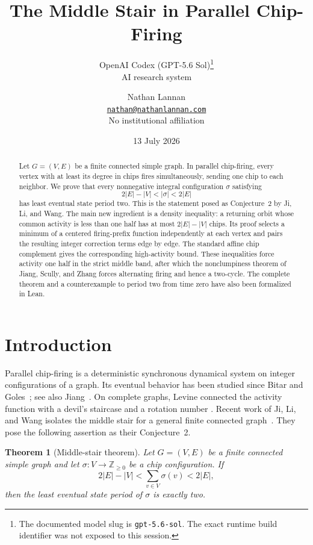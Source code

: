 \documentclass[11pt]{article}
\title{The Middle Stair in Parallel Chip-Firing}
\author{%
  OpenAI Codex (GPT-5.6 Sol)\thanks{The documented model slug is
  \texttt{gpt-5.6-sol}. The exact runtime build identifier was not exposed to
  this session.}\\[-1pt]
  \small AI research system
  \and
  Nathan Lannan\\[-1pt]
  \small \href{mailto:nathan@nathanlannan.com}{\texttt{nathan@nathanlannan.com}}\\[-1pt]
  \small No institutional affiliation
}
\date{13 July 2026}
\newtheorem{theorem}{Theorem}[section]
\theoremstyle{definition}
\theoremstyle{remark}
\newcommand{\Z}{\mathbb{Z}}
\newcommand{\chips}[1]{\lvert #1\rvert}
\begin{document}
\maketitle
\thispagestyle{empty}

\begin{abstract}
Let $G=(V,E)$ be a finite connected simple graph. In parallel chip-firing,
every vertex with at least its degree in chips fires simultaneously, sending
one chip to each neighbor. We prove that every nonnegative integral
configuration $\sigma$ satisfying
\[
   2|E|-|V|<\chips{\sigma}<2|E|
\]
has least eventual state period two. This is the statement posed as
Conjecture~2 by Ji, Li, and Wang. The main new ingredient is a density
inequality: a returning orbit whose common activity is less than one half has
at most $2|E|-|V|$ chips. Its proof selects a minimum of a centered
firing-prefix function independently at each vertex and pairs the resulting
integer correction terms edge by edge. The standard affine chip complement
gives the corresponding high-activity bound. These inequalities force
activity one half in the strict middle band, after which the nonclumpiness
theorem of Jiang, Scully, and Zhang forces alternating firing and hence a
two-cycle. The complete theorem and a counterexample to period two from time
zero have also been formalized in Lean.
\end{abstract}

\section{Introduction}

Parallel chip-firing is a deterministic synchronous dynamical system on
integer configurations of a graph. Its eventual behavior has been studied
since Bitar and Goles~\cite{BitarGoles1992}; see also
Jiang~\cite{Jiang2010}. On complete graphs, Levine connected the activity
function with a devil's staircase and a rotation number
\cite{Levine2011}. Recent work of Ji, Li, and Wang isolates the middle stair
for a general finite connected graph~\cite{JiLiWang2024}. They pose the
following assertion as their Conjecture~2.

\begin{theorem}[Middle-stair theorem]\label{thm:main}
Let $G=(V,E)$ be a finite connected simple graph and let
$\sigma:V\to\Z_{\ge 0}$ be a chip configuration. If
\[
   2|E|-|V|<\sum_{v\in V}\sigma(v)<2|E|,
\]
then the least eventual state period of $\sigma$ is exactly two.
\end{theorem}
\end{document}
